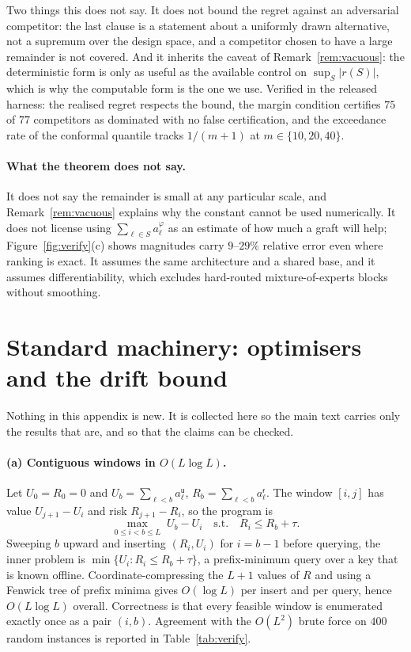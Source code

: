 \documentclass[10pt]{article}
\theoremstyle{plain}
\theoremstyle{definition}
\theoremstyle{remark}
\newcommand{\util}{\mathsf{u}}
\newcommand{\risk}{\mathsf{r}}
\begin{document}
Two things this does not say. It does not bound the regret against an adversarial
competitor: the last clause is a statement about a uniformly drawn alternative,
not a supremum over the design space, and a competitor chosen to have a large
remainder is not covered. And it inherits the caveat of
Remark~\ref{rem:vacuous}: the deterministic form is only as useful as the
available control on $\sup_S|r(S)|$, which is why the computable form is the one
we use. Verified in the released harness: the realised regret respects the bound,
the margin condition certifies $75$ of $77$ competitors as dominated with no
false certification, and the exceedance rate of the conformal quantile tracks
$1/(m+1)$ at $m\in\{10,20,40\}$.

\paragraph{What the theorem does not say.}
It does not say the remainder is small at any particular scale, and
Remark~\ref{rem:vacuous} explains why the constant cannot be used numerically.
It does not license using $\sum_{\ell\in S} a^{\varphi}_\ell$ as an estimate of
how much a graft will help; Figure~\ref{fig:verify}(c) shows magnitudes carry
$9$--$29\%$ relative error even where ranking is exact. It assumes the same
architecture and a shared base, and it assumes differentiability, which excludes
hard-routed mixture-of-experts blocks without smoothing.

\section{Standard machinery: optimisers and the drift bound}
\label{app:proof-optimiser}

Nothing in this appendix is new. It is collected here so the main text carries
only the results that are, and so that the claims can be checked.

\paragraph{(a) Contiguous windows in $O(L\log L)$.}
Let $U_0=R_0=0$ and $U_b=\sum_{\ell<b}a^{\util}_\ell$, $R_b=\sum_{\ell<b}a^{\risk}_\ell$.
The window $[i,j]$ has value $U_{j+1}-U_i$ and risk $R_{j+1}-R_i$, so the
program is
\begin{equation}
\max_{0\le i < b \le L}\; U_b - U_i
\quad\text{s.t.}\quad R_i \le R_b + \tau .
\end{equation}
Sweeping $b$ upward and inserting $(R_i,U_i)$ for $i=b-1$ before querying, the
inner problem is $\min\{U_i : R_i \le R_b+\tau\}$, a prefix-minimum query over a
key that is known offline. Coordinate-compressing the $L+1$ values of $R$ and
using a Fenwick tree of prefix minima gives $O(\log L)$ per insert and per
query, hence $O(L\log L)$ overall. Correctness is that every feasible window is
enumerated exactly once as a pair $(i,b)$. Agreement with the $O(L^2)$ brute
force on $400$ random instances is reported in Table~\ref{tab:verify}.
\end{document}
